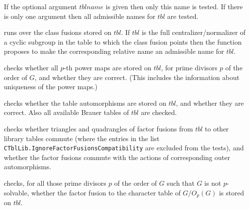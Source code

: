 \documentclass[a4paper,11pt]{report}
\begin{document}
{{\begin{description}
 If the optional argument $tblname$ is given then only this name is tested. If there is only one argument then all
admissible names for $tbl$ are tested. 
\item[{\texttt{CTblLib.Test.FindRelativeNames( }$tbl$\texttt{ )}}]  runs over the class fusions stored on $tbl$. If $tbl$ is the full centralizer/normalizer of a cyclic subgroup in the table to which
the class fusion points then the function proposes to make the corresponding
relative name an admissible name for $tbl$. 
\item[{\texttt{CTblLib.Test.PowerMaps( }$tbl$\texttt{ )}}]  checks whether all $p$-th power maps are stored on $tbl$, for prime divisors $p$ of the order of $G$, and whether they are correct. (This includes the information about
uniqueness of the power maps.) 
\item[{\texttt{CTblLib.Test.TableAutomorphisms( }$tbl$\texttt{ )}}]  checks whether the table automorphisms are stored on $tbl$, and whether they are correct. Also all available Brauer tables of $tbl$ are checked. 
\item[{\texttt{CTblLib.Test.CompatibleFactorFusions( }$tbl$\texttt{ )}}]  checks whether triangles and quadrangles of factor fusions from $tbl$ to other library tables commute (where the entries in the list \texttt{CTblLib.IgnoreFactorFusionsCompatibility} are excluded from the tests), and whether the factor fusions commute with the
actions of corresponding outer automorphisms. 
\item[{\texttt{CTblLib.Test.FactorsModPCore( }$tbl$\texttt{ )}}]  checks, for all those prime divisors $p$ of the order of $G$ such that $G$ is not $p$-solvable, whether the factor fusion to the character table of $G/O_p(G)$ is stored on $tbl$. 


\end{description}}}
\end{document}
